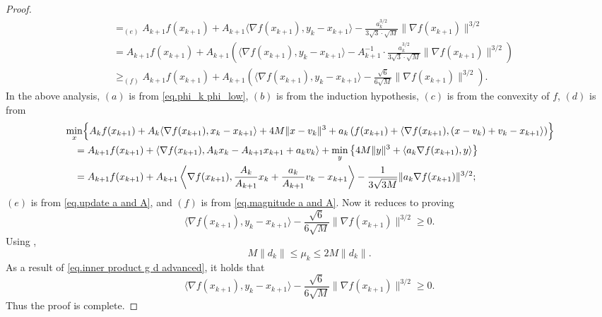 \documentclass{article}
\numberwithin{equation}{section}
\numberwithin{equation}{section}
\begin{document}
\begin{proof}
\begin{align*}
         & =_{(e)} A_{k+1} f(x_{k+1}) + A_{k+1} \langle \nabla f(x_{k+1}), y_k - x_{k+1} \rangle
        - \frac{a_k^{3/2}}{3\sqrt{3} \cdot \sqrt{M}} \|\nabla f(x_{k+1})\|^{3/2}                                                                                                                                                       \\
         & = A_{k+1} f(x_{k+1}) + A_{k+1} \left(
        \langle \nabla f(x_{k+1}), y_k - x_{k+1} \rangle
        - A_{k+1}^{-1} \cdot \frac{a_k^{3/2}}{3\sqrt{3} \cdot \sqrt{M}}
        \|\nabla f(x_{k+1})\|^{3/2} \right)                                                                                                                                                                                            \\
         & \geq_{(f)} A_{k+1} f(x_{k+1}) + A_{k+1} \left(
        \langle \nabla f(x_{k+1}), y_k - x_{k+1} \rangle
        - \frac{\sqrt{6}}{6\sqrt{M}} \|\nabla f(x_{k+1})\|^{3/2} \right).
    \end{align*}
    In the above analysis, $(a)$ is from \eqref{eq.phi_k phi_low}, $(b)$ is from the induction hypothesis, $(c)$ is from the convexity of $f$, $(d)$ is from
    \begin{equation*}
        \begin{aligned}
             & \min_{x} \Bigl\{ A_k f(x_{k+1}) + A_k \langle \nabla f(x_{k+1}), x_k - x_{k+1} \rangle + 4M \|x - v_k\|^3 + a_k \left(f(x_{k+1}) + \langle \nabla f(x_{k+1}), (x - v_k) + v_k - x_{k+1} \rangle \right) \Bigr\} \\
             & \quad = A_{k+1} f(x_{k+1}) + \left\langle \nabla f(x_{k+1}), A_k x_k - A_{k+1} x_{k+1} + a_k v_k \right\rangle + \min_{y} \left\{ 4M \|y\|^3 + \langle a_k \nabla f(x_{k+1}), y \rangle \right\}                \\
             & \quad = A_{k+1} f(x_{k+1}) + A_{k+1} \left\langle \nabla f(x_{k+1}), \frac{A_k}{A_{k+1}} x_k + \frac{a_k}{A_{k+1}} v_k - x_{k+1} \right\rangle - \frac{1}{3\sqrt{3M}} \|a_k \nabla f(x_{k+1})\|^{3/2};
        \end{aligned}
    \end{equation*}
    $(e)$ is from \eqref{eq.update a and A}, and $(f)$ is from \eqref{eq.magnitude a and A}. Now it reduces to proving
    \begin{equation*}
        \langle \nabla f(x_{k+1}),y_k-x_{k+1} \rangle -\frac{\sqrt{6}}{6\sqrt{M}}\|\nabla f(x_{k+1})\|^{3/2} \geq 0.
    \end{equation*}
    Using ,
    \begin{equation*}
        M\|d_k\| \leq \mu_k \leq 2M\|d_k\|.
    \end{equation*}
    As a result of \eqref{eq.inner product g d advanced}, it holds that
    \begin{equation*}
        \langle \nabla f(x_{k+1}),y_k-x_{k+1} \rangle -\frac{\sqrt{6}}{6\sqrt{M}}\|\nabla f(x_{k+1})\|^{3/2} \geq 0.
    \end{equation*}
    Thus the proof is complete.
\end{proof}
\end{document}
